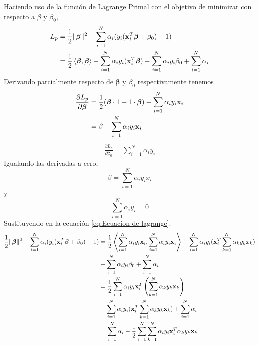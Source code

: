 \documentclass[letterpaper,12pt,oneside]{book}
\newcommand{\inprod}[2]{\left<#1, #2\right>} %
\begin{document}
{{{        Haciendo uso de la función de Lagrange Primal con el objetivo de minimizar con respecto a \(\beta\) y \(\beta_0\),
        \begin{align}
            L_p &= \frac{1}{2} \|\boldsymbol{\beta}\|^2 - \sum_{i=1}^{N} \alpha_i (y_i (\mathbf{x}_i^T \boldsymbol{\beta} + \beta_0) - 1)  \label{eq:Ecuacion de lagrange}
            \\
            &=\frac{1}{2} \inprod{\boldsymbol{\beta}}{\boldsymbol{\beta}}  - \sum_{i=1}^{N} \alpha_iy_i(\mathbf{x}_i^T \boldsymbol{\beta}) - \sum_{i=1}^{N} \alpha_i y_i \beta_0 + \sum_{i=1}^{N}\alpha_i \notag
        \end{align}
        Derivando parcialmente respecto de \(\boldsymbol{\beta}\) y \(\beta_0\) respectivamente tenemos
        \begin{align}
            \frac{\partial L_p}{\partial \boldsymbol{\beta}} &= \frac{1}{2} (\boldsymbol{\beta}\cdot 1 + 1\cdot \boldsymbol{\beta}) - \sum_{i=1}^{N} \alpha_i y_i \mathbf{x}_i \notag \\
            &=\beta - \sum_{i=1}^{N} \alpha_i y_i \mathbf{x}_i
        \end{align}
        \begin{align}
            \frac{\partial L_p}{\partial \beta_0} =\sum_{i=1}^{N} \alpha_i y_i 
        \end{align}
        Igualando las derivadas a cero,
        \begin{equation}
            \beta = \sum_{i=1}^{N} \alpha_i y_i x_i \label{eq:Beta}
        \end{equation} y 
        \begin{equation}
             \sum_{i=1}^{N} \alpha_i y_i = 0
        \end{equation}
        Sustituyendo en la ecuación \eqref{eq:Ecuacion de lagrange}.
        \begin{align}
            \frac{1}{2} \|\boldsymbol{\beta}\|^2 - \sum_{i=1}^{N} \alpha_i (y_i (\mathbf{x}_i^T \boldsymbol{\beta} + \beta_0) - 1) &= \frac{1}{2} \inprod{\sum_{i=1}^{N} \alpha_i y_i \mathbf{x}_i}{\sum_{i=1}^{N} \alpha_i y_i \mathbf{x}_i} - \sum_{i=1}^{N} \alpha_iy_i(\mathbf{x}_i^T \sum_{k=1}^{N} \alpha_k y_k x_k) \notag\\
        &-\sum_{i=1}^{N} \alpha_i y_i \beta_0 + \sum_{i=1}^{N}\alpha_i \notag \\
           &= \frac{1}{2} \sum_{i=1}^{N} \alpha_iy_i \mathbf{x}_i^T \left( \sum_{k=1}^{N} \alpha_k y_k \mathbf{x}_k \right)\notag\\
           &  - \sum_{i=1}^{N} \alpha_iy_i(\mathbf{x}_i^T \sum_{k=1}^{N} \alpha_k y_k \mathbf{x}_k) + \sum_{i=1}^{N} \alpha_i \notag\\
           &= \sum_{i=1}^{N} \alpha_i- \frac{1}{2} \sum_{i=1}^{N}\sum_{k=1}^{N} \alpha_iy_i \mathbf{x}_i^T   \alpha_k y_k \mathbf{x}_k   
        \end{align}
    
}}}
\end{document}
